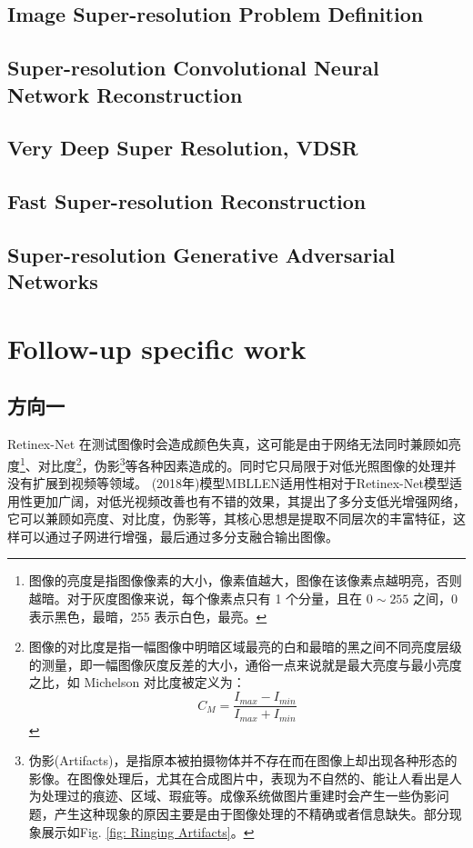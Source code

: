 \documentclass[letterpaper,10pt]{article}
\begin{document}
		\subsection{Image Super-resolution Problem Definition}
		
		\subsection{Super-resolution Convolutional Neural Network Reconstruction}
		
		\subsection{Very Deep Super Resolution, VDSR}
		
		\subsection{Fast Super-resolution Reconstruction}
		
		\subsection{Super-resolution Generative Adversarial Networks}
		
	
	\section{Follow-up specific work}
	
		\subsection{方向一}
		
		Retinex-Net 在测试图像时会造成颜色失真，这可能是由于网络无法同时兼顾如亮度\footnote{图像的亮度是指图像像素的大小，像素值越大，图像在该像素点越明亮，否则越暗。对于灰度图像来说，每个像素点只有 1 个分量，且在 $0 \sim 255$ 之间，0 表示黑色，最暗，255 表示白色，最亮。}、对比度\footnote{图像的对比度是指一幅图像中明暗区域最亮的白和最暗的黑之间不同亮度层级的测量，即一幅图像灰度反差的大小，通俗一点来说就是最大亮度与最小亮度之比，如 Michelson 对比度被定义为：$$C_M = \frac{I_{max} - I_{min}}{I_{max} + I_{min}}$$}，伪影\footnote{伪影(Artifacts)，是指原本被拍摄物体并不存在而在图像上却出现各种形态的影像。在图像处理后，尤其在合成图片中，表现为不自然的、能让人看出是人为处理过的痕迹、区域、瑕疵等。成像系统做图片重建时会产生一些伪影问题，产生这种现象的原因主要是由于图像处理的不精确或者信息缺失。部分现象展示如Fig. \ref{fig: Ringing Artifacts}。
		
		}等各种因素造成的。同时它只局限于对低光照图像的处理并没有扩展到视频等领域。
		(2018年)模型MBLLEN\cite{Lv2018MBLLEN}适用性相对于Retinex-Net模型适用性更加广阔，对低光视频改善也有不错的效果，其提出了多分支低光增强网络，它可以兼顾如亮度、对比度，伪影等，其核心思想是提取不同层次的丰富特征，这样可以通过子网进行增强，最后通过多分支融合输出图像。
		
\end{document}
